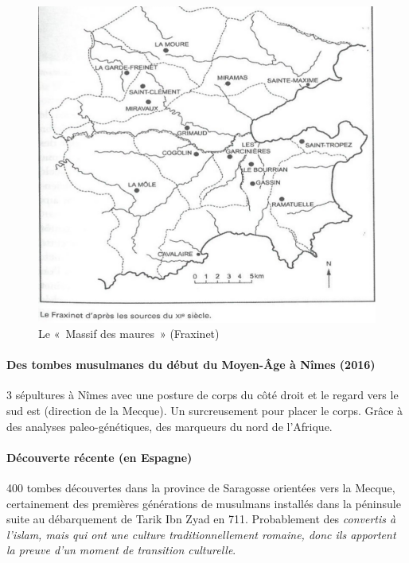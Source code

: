 \begin{figure}[h!]
    \centering
    \includegraphics[width=\textwidth]{Images/Fraxinet.png}
    \caption{Le « Massif des maures » (Fraxinet) }
    \label{fig:Fraxinet}
\end{figure}

\paragraph{Des tombes musulmanes du début du Moyen-Âge à Nîmes (2016)}

3 sépultures à Nîmes avec une posture de corps du côté droit et le regard vers le sud est (direction de la Mecque). Un surcreusement pour placer le corps. Grâce à des analyses paleo-génétiques, des marqueurs du nord de l'Afrique.

\paragraph{Découverte récente (en Espagne)}

400 tombes découvertes dans la province de Saragosse orientées vers la Mecque, certainement des premières générations de musulmans installés dans la péninsule suite au débarquement de Tarik Ibn Zyad en 711. Probablement des \textit{convertis à l'islam, mais qui ont une culture traditionnellement romaine, donc ils apportent la preuve d'un moment de transition culturelle}.


